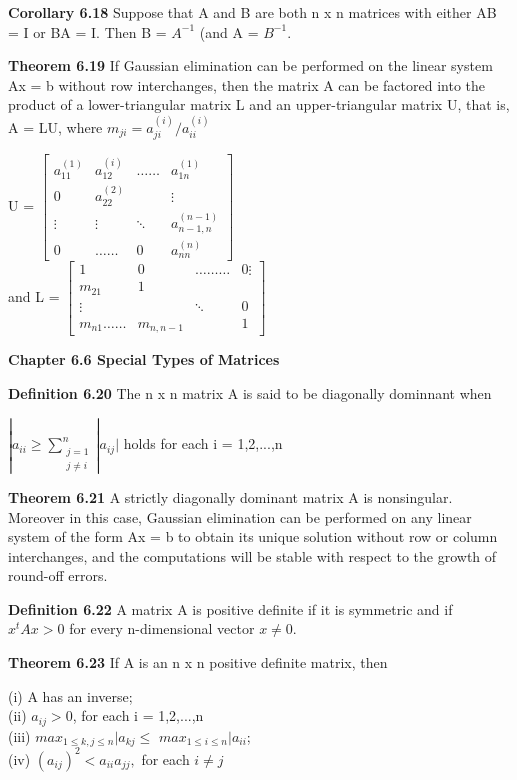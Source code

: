 \documentclass{article}
\begin{document}
\textbf {Corollary 6.18} Suppose that A and B are both n x n matrices with either AB = I or BA = I. Then B = $A^{-1}$ (and A = $B^{-1}$.

\textbf {Theorem 6.19} If Gaussian elimination can be performed on the linear system Ax = b without row interchanges, then the matrix A can be factored into the product of a lower-triangular matrix L and an upper-triangular matrix U, that is, A = LU, where $m_{ji} = a_{ji}^{(i)} / a_{ii}^{(i)}$

\begin{center}
U = $ 
\begin{bmatrix}

a_{11}^{(1)} & a_{12}^{(i)} & \dots \dots  & a_{1n}^{(1)} \\
0 & a_{22}^{(2)} & & \vdots \\
\vdots  & \vdots & \ddots & a_{n-1, n}^{(n-1)} \\
0 & \dots \dots & 0 & a_{nn}^{(n)}
\end{bmatrix}
$
\\ and L = 
$
\begin{bmatrix}
1 & 0 & \dots \dots \dots & 0 \vdots \\
m_{21} & 1 \\
\vdots & & \ddots & 0 \\
m_{n1} \dots \dots & m_{n, n-1}  & & 1
\end{bmatrix}
$
\end{center}

\textbf {Chapter 6.6 Special Types of Matrices}

\textbf {Definition 6.20} The n x n matrix A is said to be diagonally dominnant when
\begin{center}
$
|a_{ii} \geq \sum_{\substack{j=1\\ j \neq i}}^n |a_{ij}|
$
holds for each i = 1,2,...,n
\end{center}

\textbf {Theorem 6.21} A strictly diagonally dominant matrix A is nonsingular. Moreover in this case, Gaussian elimination can be performed on any linear system of the form Ax = b to obtain its unique solution without row or column interchanges, and the computations will be stable with respect to the growth of round-off errors.

\textbf {Definition 6.22} A matrix A is positive definite if it is symmetric and if $x^{t}Ax > 0$ for every n-dimensional vector $x \neq 0$.

\textbf {Theorem 6.23} If A is an n x n positive definite matrix, then
\begin{center}
(i) A has an inverse; \\
(ii) $a_{ij} > 0$, for each i = 1,2,...,n \\
(iii) $max_{1 \leq k, j \leq n} |a_{kj} \leq$ $max_{1 \leq i \leq n} |a_{ii}$; \\
(iv) $(a_{ij})^2 < a_{ii} a_{jj},$ for each $i \neq j $
\end{center}
\end{document}
